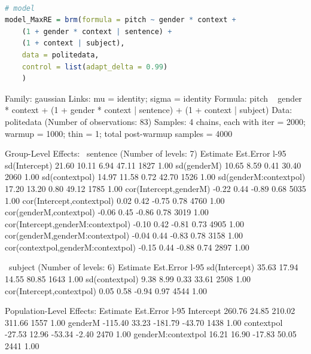 \documentclass[nobib]{tufte-handout}
\begin{document}
\bigskip

\begin{minipage}[]{1\textwidth}
\begin{lstlisting}[language=R]

# model
model_MaxRE = brm(formula = pitch ~ gender * context +
	(1 + gender * context | sentence) +
	(1 + context | subject),
	data = politedata,
	control = list(adapt_delta = 0.99)
	)
\end{lstlisting}
\end{minipage}

\medskip

\begin{minipage}[]{1.5\textwidth}
\begin{rc}
 Family: gaussian 
  Links: mu = identity; sigma = identity 
Formula: pitch ~ gender * context + (1 + gender * context | sentence) + (1 + context | subject) 
   Data: politedata (Number of observations: 83) 
Samples: 4 chains, each with iter = 2000; warmup = 1000; thin = 1;
         total post-warmup samples = 4000

Group-Level Effects: 
~sentence (Number of levels: 7) 
                                   Estimate Est.Error l-95%
sd(Intercept)                         21.60     10.11     6.94    47.11       1827 1.00
sd(genderM)                           10.65      8.59     0.41    30.40       2060 1.00
sd(contextpol)                        14.97     11.58     0.72    42.70       1526 1.00
sd(genderM:contextpol)                17.20     13.20     0.80    49.12       1785 1.00
cor(Intercept,genderM)                -0.22      0.44    -0.89     0.68       5035 1.00
cor(Intercept,contextpol)              0.02      0.42    -0.75     0.78       4760 1.00
cor(genderM,contextpol)               -0.06      0.45    -0.86     0.78       3019 1.00
cor(Intercept,genderM:contextpol)     -0.10      0.42    -0.81     0.73       4905 1.00
cor(genderM,genderM:contextpol)       -0.04      0.44    -0.83     0.78       3158 1.00
cor(contextpol,genderM:contextpol)    -0.15      0.44    -0.88     0.74       2897 1.00

~subject (Number of levels: 6) 
                          Estimate Est.Error l-95%
sd(Intercept)                35.63     17.94    14.55    80.85       1643 1.00
sd(contextpol)                9.38      8.99     0.33    33.61       2508 1.00
cor(Intercept,contextpol)     0.05      0.58    -0.94     0.97       4544 1.00

Population-Level Effects: 
                   Estimate Est.Error l-95%
Intercept            260.76     24.85   210.02   311.66       1557 1.00
genderM             -115.40     33.23  -181.79   -43.70       1438 1.00
contextpol           -27.53     12.96   -53.34    -2.40       2470 1.00
genderM:contextpol    16.21     16.90   -17.83    50.05       2441 1.00


\end{rc}
\end{minipage}
\end{document}
